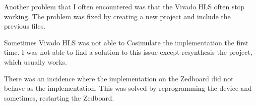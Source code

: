 Another problem that I often encountered was that the Vivado HLS often stop working. The problem was fixed by creating a new project and include the previous files.

Sometimes Vivado HLS was not able to Cosimulate the implementation the first time. I was not able to find a solution to this issue except resynthesis the project, which usually works.

There was an incidence where the implementation on the Zedboard did not behave as the implementation. This was solved by reprogramming the device and sometimes, restarting the Zedboard.
